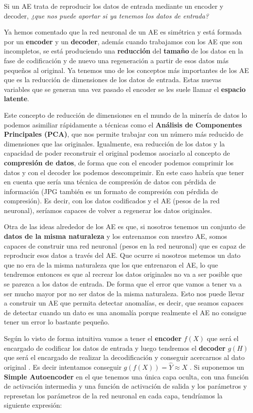 \documentclass[
  a4paper,
  DIV=11,
  numbers=noendperiod]{scrreprt}
\begin{document}
Si un AE trata de reproducir los datos de entrada mediante un encoder y
decoder, \emph{¿que nos puede aportar si ya tenemos los datos de
entrada?}

Ya hemos comentado que la red neuronal de un AE es simétrica y está
formada por un \textbf{encoder} y un \textbf{decoder}, además cuando
trabajamos con los AE que son incompletos, se está produciendo una
\textbf{reducción} del \textbf{tamaño} de los datos en la fase de
codificación y de nuevo una regeneración a partir de esos datos más
pequeños al original. Ya tenemos uno de los conceptos más importantes de
los AE que es la reducción de dimensiones de los datos de entrada. Estas
nuevas variables que se generan una vez pasado el encoder se les suele
llamar el \textbf{espacio latente}.

Este concepto de reducción de dimensiones en el mundo de la minería de
datos lo podemos asimiliar rápidamente a técnicas como el
\textbf{Análisis de Componentes Principales (PCA)}, que nos permite
trabajar con un número más reducido de dimensiones que las originales.
Igualmente, esa reducción de los datos y la capacidad de poder
reconstruir el original podemos asociarlo al concepto de
\textbf{compresión de datos}, de forma que con el encoder podemos
comprimir los datos y con el decoder los podemos descomprimir. En este
caso habría que tener en cuenta que sería una técnica de compresión de
datos con pérdida de información (JPG también es un formato de
compresión con pérdida de compresión). Es decir, con los datos
codificados y el AE (pesos de la red neuronal), seríamos capaces de
volver a regenerar los datos originales.

Otra de las ideas alrededor de los AE es que, si nosotros tenemos un
conjunto de \textbf{datos de la misma naturaleza} y los entrenamos con
nuestro AE, somos capaces de construir una red neuronal (pesos en la red
neuronal) que es capaz de reproducir esos datos a través del AE. Que
ocurre si nosotros metemos un dato que no era de la misma naturaleza que
los que entrenaron el AE, lo que tendremos entonces es que al recrear
los datos originales no va a ser posible que se parezca a los datos de
entrada. De forma que el error que vamos a tener va a ser mucho mayor
por no ser datos de la misma naturaleza. Esto nos puede llevar a
construir un AE que permita detectar anomalías, es decir, que seamos
capaces de detectar cuando un dato es una anomalía porque realmente el
AE no consigue tener un error lo bastante pequeño.

Según lo visto de forma intuitiva vamos a tener el \textbf{encoder}
\(f(X)\) que será el encargado de codificar los datos de entrada y luego
tendremos el \textbf{decoder} \(g(H)\) que será el encargado de realizar
la decodificación y conseguir acercarnos al dato original . Es decir
intentamos conseguir \(g(f(X))=\hat{Y} \approx X\) . Si suponemos un
\textbf{Simple Autoencoder} en el que tenemos una única capa oculta, con
una función de activación intermedia y una función de activación de
salida y los parámetros y represetan los parámetros de la red neuronal
en cada capa, tendríamos la siguiente expresión:
\end{document}
